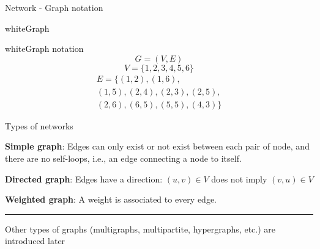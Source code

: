 \documentclass[a4paper,11pt]{book}
\begin{document}
\begin{textbox}{Network - Graph notation}
\begin{multibox}{2}
\begin{subbox}{white}{\textcolor{black}{Graph}}
\centering
\adjustbox{width=0.9\textwidth }{
\begin{tikzpicture}[scale=0.3,rotate=0][every node/.style={inner sep=0,outer sep=0}]
\clip (0,-0.5) rectangle (6,6.5);
\Vertex[x=1.781,y=1.331,size=0.3,opacity=0.8,label=1]{0}
\Vertex[x=3.083,y=3.151,size=0.3,opacity=0.8,label=2]{1}
\Vertex[x=2.831,y=0.200,size=0.3,opacity=0.8,label=6]{5}
\Vertex[x=4.058,y=1.136,size=0.3,opacity=0.8,label=5]{4}
\Vertex[x=4.219,y=5.643,size=0.3,opacity=0.8,label=3]{2}
\Vertex[x=2.386,y=5.800,size=0.3,opacity=0.8,label=4]{3}
\Edge[](0)(1)
\Edge[](0)(5)
\Edge[](0)(4)
\Edge[](1)(2)
\Edge[](1)(3)
\Edge[](1)(4)
\Edge[](1)(5)
\Edge[](5)(4)
\Edge[](4)(4)
\Edge[](2)(3)
\end{tikzpicture}
}%
\end{subbox}
\begin{subbox}{white}{\textcolor{black}{Graph notation}}
\[
G=(V,E)
\]
\[
V=\{1,2,3,4,5,6\}
\]
\[
\begin{split}
E=\{(1, 2),
 (1, 6),\\
 (1, 5),
 (2, 4),
 (2, 3),
 (2, 5),\\
 (2, 6),
 (6, 5),
 (5, 5),
 (4, 3)\}
 \end{split}
\]
\end{subbox}

\end{multibox}
\end{textbox}












\begin{textbox}{Types of networks}

\textbf{Simple graph}: Edges can only exist or not exist between each pair of node, and there are no self-loops, i.e., an edge connecting a node to itself.

\textbf{Directed graph}: Edges have a direction: $(u,v)\in V$ does not imply $(v,u)\in V$ 

\textbf{Weighted graph}: A weight is associated to every edge. 

    
\noindent\rule{4cm}{0.1pt}

\tiny{
Other types of graphs (multigraphs, multipartite, hypergraphs, etc.) are introduced later}


\end{textbox}
\end{document}

